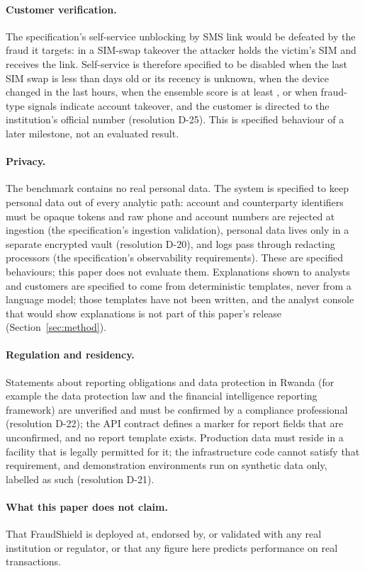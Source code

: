 \paragraph{Customer verification.} The specification's self-service unblocking by SMS link would
be defeated by the fraud it targets: in a SIM-swap takeover the attacker holds the victim's SIM and
receives the link. Self-service is therefore specified to be disabled when the last SIM swap is less than
\nSelfServiceSimDays{} days old or its recency is unknown, when the device changed in the last
\nSelfServiceDeviceHours{} hours, when the ensemble score is at least \nSelfServiceScore{}, or when fraud-type
signals indicate account takeover, and the customer is directed to the institution's official number (resolution D-25). This is specified behaviour of
a later milestone, not an evaluated result.

\paragraph{Privacy.} The benchmark contains no real personal data. The system is specified to keep
personal data out of every analytic path: account and counterparty identifiers must be opaque tokens
and raw phone and account numbers are rejected at ingestion (the specification's ingestion
validation), personal data lives only in a separate encrypted vault (resolution D-20), and logs pass
through redacting processors (the specification's observability requirements). These are specified
behaviours; this paper does not evaluate them.
Explanations shown to analysts and customers are specified to come from deterministic
templates, never from a language model; those templates have not been written, and the analyst
console that would show explanations is not part of this paper's release (Section~\ref{sec:method}).

\paragraph{Regulation and residency.} Statements about reporting obligations and data protection
in Rwanda (for example the data protection law and the financial intelligence reporting framework)
are unverified and must be confirmed by a compliance professional (resolution D-22); the API
contract defines a marker for report fields that are unconfirmed, and no report template exists. Production data must reside in a facility that is
legally permitted for it; the infrastructure code cannot satisfy that requirement, and
demonstration environments run on synthetic data only, labelled as such (resolution D-21).

\paragraph{What this paper does not claim.} That FraudShield is deployed at, endorsed by, or
validated with any real institution or regulator, or that any figure here predicts performance on
real transactions.
